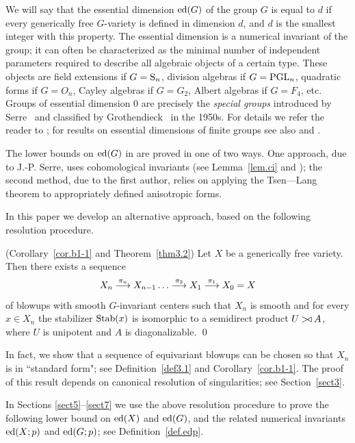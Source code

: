 We will say that the essential dimension $\operatorname{ed}(G)$ of the group $G$
is equal to $d$ if every generically free $G$-variety 
is defined in dimension $d$,
and $d$ is the smallest integer with this property.
The essential dimension is a numerical invariant of the group; it  
can often be characterized as the minimal number of independent 
parameters required to describe all algebraic objects
of a certain type. These objects are field extensions 
if $G = {\operatorname{S}}_n$, division algebras if $G = \operatorname{PGL}_n$, quadratic
forms if $G= O_n$, Cayley algebras if $G = G_2$, Albert algebras 
if $G=F_4$, etc. Groups of essential dimension 0
are precisely the {\em special groups} introduced by 
Serre~\cite{serre1} and classified by Grothendieck~\cite{grothendieck}
in the 1950s.  For details we refer the reader to \cite{r2}; for results 
on essential dimensions of finite groups see also \cite{br1} and \cite{br2}.

The lower bounds on $\operatorname{ed}(G)$ in \cite{r2} are proved in one of
two ways. One approach, due to J.-P. Serre, uses cohomological
invariants (see Lemma~\ref{lem.ci} and \cite[Section~12]{r2}); 
the second method, due to 
the first author, relies on applying the Tsen---Lang theorem to
appropriately defined anisotropic forms. 

In this paper we develop an alternative approach, based on the following 
resolution procedure.

\begin{thm} \label{thm1.1} (Corollary~\ref{cor.b1-1} and Theorem~\ref{thm3.2})
Let $X$ be a generically free variety. Then
there exists a sequence
\[
X_n \stackrel{\pi_n}{\longrightarrow} X_{n-1}
\dots \stackrel{\pi_2}{\longrightarrow} X_1 \stackrel{\pi_1}{\longrightarrow} X_0 = X
\]
of blowups with smooth $G$-invariant centers such that $X_n$ is smooth 
and for every $x \in X_n$ the stabilizer $\operatorname{Stab}(x)$ is isomorphic 
to a semidirect 
product $U \mathbin{{>}\!{\triangleleft}} A$, where $U$ is unipotent and $A$ is diagonalizable.
\qed
\end{thm}

In fact, we show that a sequence of equivariant blowups can be chosen
so that $X_n$ is in ``standard form"; 
see Definition~\ref{def3.1} and Corollary~\ref{cor.b1-1}. 
The proof of this result
depends on canonical resolution of singularities; see Section~\ref{sect3}. 

In Sections \ref{sect5}--\ref{sect7} we use the above resolution procedure
to prove the following lower bound on $\operatorname{ed}(X)$ and $\operatorname{ed}(G)$, and the related
numerical invariants $\operatorname{ed}(X;p)$ and $\operatorname{ed}(G;p)$; see Definition~\ref{def.edp}. 

